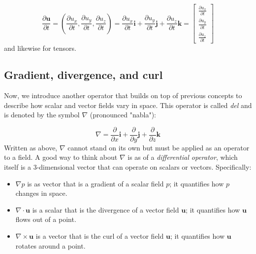 \documentclass[12pt]{article}
\numberwithin{equation}{section}
\numberwithin{figure}{section}
\numberwithin{table}{section}
\begin{document}
\begin{equation}
  \frac{\partial \mathbf{u}}{\partial t}
    = \left(\frac{\partial u_x}{\partial t}, \frac{\partial u_y}{\partial t}, \frac{\partial u_z}{\partial t}\right)
    = \frac{\partial u_x}{\partial t} \mathbf{i} + \frac{\partial u_y}{\partial t} \mathbf{j} + \frac{\partial u_z}{\partial t} \mathbf{k}
    = \begin{bmatrix}
        \frac{\partial u_x}{\partial t} \\
        \frac{\partial u_y}{\partial t} \\
        \frac{\partial u_z}{\partial t}
      \end{bmatrix}
\end{equation}
and likewise for tensors.\\

\subsection{Gradient, divergence, and curl}

Now, we introduce another operator that builds on top of previous
concepts to describe how scalar and vector fields vary in space.
This operator is called \textit{del} and is denoted by the symbol
$\nabla$ (pronounced "nabla"):

\begin{equation}
  \label{eq:nabla}
  \nabla = \frac{\partial}{\partial x} \mathbf{i} +
    \frac{\partial}{\partial y} \mathbf{j} +
    \frac{\partial}{\partial z} \mathbf{k}
\end{equation}
Written as above, $\nabla$ cannot stand on its own but must be applied as an
operator to a field.
A good way to think about $\nabla$ is as of a \textit{differential operator},
which itself is a 3-dimensional vector that can operate on scalars or vectors.
Specifically:

\begin{itemize}
  \item $\nabla p$ is as vector that is a gradient of a scalar field $p$;
  it quantifies how $p$ changes in space.
  \item $\nabla \cdot \mathbf{u}$ is a scalar that is the divergence of a vector
  field $\mathbf{u}$; it quantifies how $\mathbf{u}$ flows out of a point.
  \item $\nabla \times \mathbf{u}$ is a vector that is the curl of a vector field
  $\mathbf{u}$; it quantifies how $\mathbf{u}$ rotates around a point.
\end{itemize}
\end{document}
